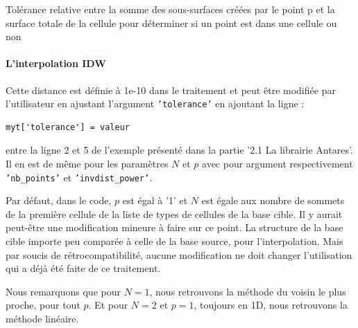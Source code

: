Tolérance relative entre la somme des sous-surfaces créées par le point p et la surface totale de la cellule pour déterminer si un point est dans une cellule ou non\label{pt_cell}

\label{implementation_IDW}\paragraph{L'interpolation IDW}

Cette distance est définie à 1e-10 dans le traitement et peut être modifiée par l'utilisateur en ajustant l'argument \texttt{'tolerance'} en ajoutant la ligne :
\begin{lstlisting}[]
    myt['tolerance'] = valeur
\end{lstlisting}
entre la ligne 2 et 5 de l'exemple présenté dans la partie '2.1 La librairie Antares'.
Il en est de même pour les paramètres \(N\) et \(p\) avec pour argument respectivement \texttt{'nb\_points'} et \texttt{'invdist\_power'}.\label{parametres}

Par défaut, dans le code, \(p\) est égal à '1' et \(N\) est égale aux nombre de sommets de la première cellule de la liste de types de cellules de la base cible. Il y aurait peut-être une modification mineure à faire sur ce point. La structure de la base cible importe peu comparée à celle de la base source, pour l'interpolation. Mais par soucis de rétrocompatibilité, aucune modification ne doit changer l'utilisation qui a déjà été faite de ce traitement. %

Nous remarquons que pour \( N = 1 \), nous retrouvons la méthode du voisin le plus proche, pour tout \( p \).
Et pour \( N = 2 \) et \( p = 1 \), toujours en 1D, nous retrouvons la méthode linéaire.

